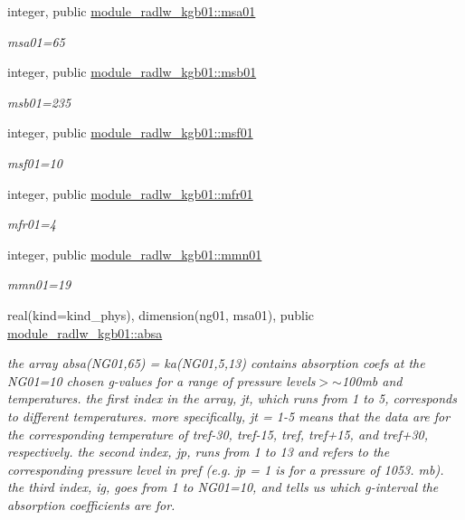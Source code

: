 \begin{DoxyCompactItemize}
\mbox{\label{namespacemodule__radlw__kgb01_a60db2a67b7f03a52fa88acd2c7874dfc}} 
integer, public \hyperlink{namespacemodule__radlw__kgb01_a60db2a67b7f03a52fa88acd2c7874dfc}{module\+\_\+radlw\+\_\+kgb01\+::msa01}
\begin{DoxyCompactList}\small\item\em msa01=65 \end{DoxyCompactList}\item 
integer, public \hyperlink{group__module__radlw__kgbnn_gae34d953adc793ad27a294864e3e0e354}{module\+\_\+radlw\+\_\+kgb01\+::msb01}
\begin{DoxyCompactList}\small\item\em msb01=235 \end{DoxyCompactList}\item 
integer, public \hyperlink{group__module__radlw__kgbnn_ga321c2e84e14d28142d08bb5fbe485a67}{module\+\_\+radlw\+\_\+kgb01\+::msf01}
\begin{DoxyCompactList}\small\item\em msf01=10 \end{DoxyCompactList}\item 
integer, public \hyperlink{group__module__radlw__kgbnn_ga4bd2e710d96291436f9ee36e99816a19}{module\+\_\+radlw\+\_\+kgb01\+::mfr01}
\begin{DoxyCompactList}\small\item\em mfr01=4 \end{DoxyCompactList}\item 
integer, public \hyperlink{group__module__radlw__kgbnn_ga218c6844f9043f362571f091a4f80522}{module\+\_\+radlw\+\_\+kgb01\+::mmn01}
\begin{DoxyCompactList}\small\item\em mmn01=19 \end{DoxyCompactList}\item 
real(kind=kind\+\_\+phys), dimension(ng01, msa01), public \hyperlink{group__module__radlw__kgbnn_gacdbe767d50d503c4a89d4042dd0dee8e}{module\+\_\+radlw\+\_\+kgb01\+::absa}
\begin{DoxyCompactList}\small\item\em the array absa(\+N\+G01,65) = ka(\+N\+G01,5,13) contains absorption coefs at the N\+G01=10 chosen g-\/values for a range of pressure levels$>$$\sim$100mb and temperatures. the first index in the array, jt, which runs from 1 to 5, corresponds to different temperatures. more specifically, jt = 1-\/5 means that the data are for the corresponding temperature of tref-\/30, tref-\/15, tref, tref+15, and tref+30, respectively. the second index, jp, runs from 1 to 13 and refers to the corresponding pressure level in pref (e.\+g. jp = 1 is for a pressure of 1053. mb). the third index, ig, goes from 1 to N\+G01=10, and tells us which g-\/interval the absorption coefficients are for. \end{DoxyCompactList}\item 

\end{DoxyCompactItemize}
